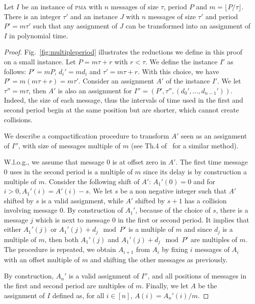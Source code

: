\documentclass[a4paper,UKenglish,cleveref, autoref, thm-restate]{lipics-v2019}
\newcommand\pma{\textsc{pma}\xspace}
\begin{document}
\begin{lemma}\label{lemma:multiple}
Let $I$ be an instance of \pma with $n$ messages of size $\tau$, period $P$ and $m = \lfloor P / \tau \rfloor$. There is an integer $\tau'$ and an instance $J$ with $n$ messages of size $\tau'$ and period $P'= m\tau'$ such that any assignment of $J$ can be transformed into an assignment of $I$ in polynomial time.
\end{lemma}
\begin{proof}
Fig.~\ref{fig:multipleperiod} illustrates the reductions we define in this proof on a small instance.
Let $P = m \tau + r$ with $r < \tau$. We define the instance $I'$ as follows: $P' = mP$, $d_{i}' = m d_i$ and $\tau' = m \tau + r$. With this choice, we have $P' = m(m \tau + r) = m \tau'$.
Consider an assignment $A'$ of the instance $I'$. We let $\tau'' = m\tau$, then $A'$ is also an assignment for $I'' = (P',\tau'',(d_{0}',\dots,d_{n-1}'))$. Indeed, the size of each message, thus the intervals of time used in the first and second period begin at the same position but are shorter, which cannot create collisions. 

We describe a compactification procedure to transform $A'$ seen as an assignment of $I''$, with size of messages multiple of $m$ (see Th.4 of~\cite{bartharxiv2018deterministic} for a similar method). 

W.l.o.g., we assume that message $0$ is at offset zero in $A'$. The first time message $0$ uses in the second period is a multiple of $m$ since its delay is by construction a multiple of $m$. Consider the following shift of $A'$: $A_1'(0) = 0$ and for $i>0, A_1'(i) = A'(i) - s$. We let $s$ be a non negative integer such that $A'$ shifted by $s$ is a valid assignment, while $A'$ shifted by $s+1$ has a collision involving message $0$. By construction of $A_1'$, because of the choice of $s$, there is a message $j$ which is next to message $0$ in the first or second period. It implies that either $A_1'(j)$ or $A_1'(j)+d_j \mod P'$ is a multiple of $m$ and since $d_j$ is a multiple of $m$, then both $A_1'(j)$ and $A_1'(j)+d_j \mod P'$ are multiples of $m$. The procedure is repeated, we obtain $A_{i+1}$ from $A_i$ by fixing
$i$ messages of $A_i$ with an offset multiple of $m$ and shifting the other messages as previously. 


By construction, $A_n'$ is a valid assignment of $I''$, and all positions of messages in the first and second period are multiples of $m$. Finally, we let $A$ be the assignment of $I$ defined as, for all $i \in [n]$, $A(i) = A_n'(i)/m$. 
\end{proof}
\end{document}
